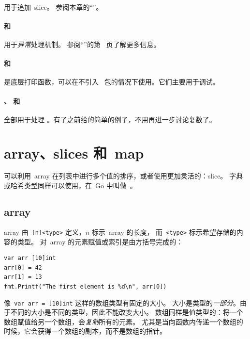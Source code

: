 \paragraph{} 用于追加~slice。
参阅本章的``''。

\paragraph{ 和~} 用于\emph{异常}处理机制。
参阅``''的第~\pageref{sec:panic} 页了解更多信息。

\paragraph{ 和~} 是底层打印函数，可以在不引入~
 包的情况下使用。它们主要用于调试。

\paragraph{、 和~} 全部用于处理
。有了之前给的简单的例子，不用再进一步讨论复数了。


\section{array、slices 和~map}
\label{sec:arrays}
可以利用~array 在列表中进行多个值的排序，或者使用更加灵活的：slice。
字典或哈希类型同样可以使用，在~Go 中叫做~。

\subsection{array}
array 由~\verb|[n]<type>| 定义，$n$ 标示~array 的长度，
而~\verb|<type>| 标示希望存储的内容的类型。
对~array 的元素赋值或索引是由方括号完成的：
\begin{lstlisting}
var arr [10]int
arr[0] = 42
arr[1] = 13
fmt.Printf("The first element is %d\n", arr[0])
\end{lstlisting}
像~\lstinline{var arr = [10]int} 这样的数组类型有固定的大小。
大小是类型的\emph{一部分}。由于不同的大小是不同的类型，因此不能改变大小。
数组同样是值类型的：将一个数组赋值给另一个数组，会\emph{复制}所有的元素。
尤其是当向函数内传递一个数组的时候，它会获得一个数组的副本，而不是数组的指针。

